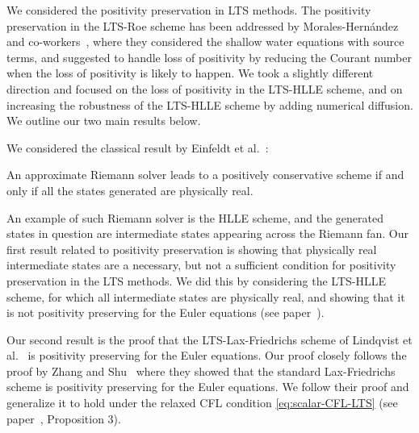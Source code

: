 We considered the positivity preservation in LTS methods. The positivity preservation in the LTS-Roe scheme has been addressed by Morales-Hern\'{a}ndez and co-workers~\cite{mor12a,mor14}, where they considered the shallow water equations with source terms, and suggested to handle loss of positivity by reducing the Courant number when the loss of positivity is likely to happen. We took a slightly different direction and focused on the loss of positivity in the LTS-HLLE scheme, and on increasing the robustness of the LTS-HLLE scheme by adding numerical diffusion. We outline our two main results below.

We considered the classical result by Einfeldt et al.~\cite{ein91}:
\begin{lemma}
An approximate Riemann solver leads to a positively conservative scheme if and only if all the states generated are physically real.
\end{lemma} 
An example of such Riemann solver is the HLLE scheme, and the generated states in question are intermediate states appearing across the Riemann fan. Our first result related to positivity preservation is showing that physically real intermediate states are a necessary, but not a sufficient condition for positivity preservation in the LTS methods. We did this by considering the LTS-HLLE scheme, for which all intermediate states are physically real, and showing that it is not positivity preserving for the Euler equations (see paper~\cite{jp3}). 

Our second result is the proof that the LTS-Lax-Friedrichs scheme of Lindqvist et al.~\cite{lin16} is positivity preserving for the Euler equations. Our proof closely follows the proof by Zhang and Shu~\cite{zha10b} where they showed that the standard Lax-Friedrichs scheme is positivity preserving for the Euler equations. We follow their proof and generalize it to hold under the relaxed CFL condition \eqref{eq:scalar-CFL-LTS} (see paper~\cite{jp3}, Proposition 3).

